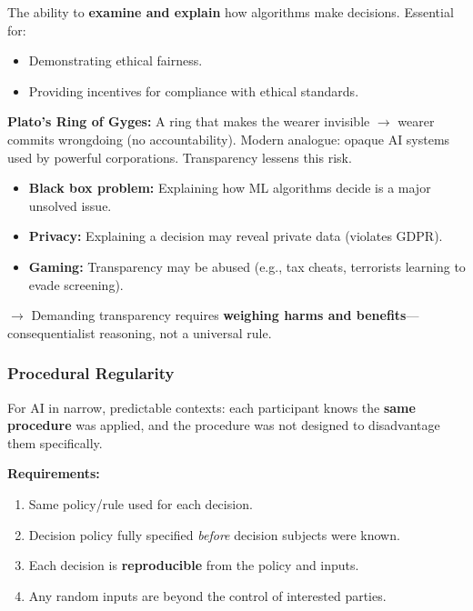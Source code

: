 \begin{defbox}[Transparency]
The ability to \textbf{examine and explain} how algorithms make decisions. Essential for:
\begin{itemize}
  \item Demonstrating ethical fairness.
  \item Providing incentives for compliance with ethical standards.
\end{itemize}

\textbf{Plato's Ring of Gyges:} A ring that makes the wearer invisible $\to$ wearer commits wrongdoing (no accountability). Modern analogue: opaque AI systems used by powerful corporations. Transparency lessens this risk.
\end{defbox}

\begin{tipbox}
\begin{itemize}
  \item \textbf{Black box problem:} Explaining how ML algorithms decide is a major unsolved issue.
  \item \textbf{Privacy:} Explaining a decision may reveal private data (violates GDPR).
  \item \textbf{Gaming:} Transparency may be abused (e.g., tax cheats, terrorists learning to evade screening).
\end{itemize}
$\to$ Demanding transparency requires \textbf{weighing harms and benefits}---consequentialist reasoning, not a universal rule.
\end{tipbox}

\separator

\subsubsection{Procedural Regularity}

\begin{defbox}
For AI in narrow, predictable contexts: each participant knows the \textbf{same procedure} was applied, and the procedure was not designed to disadvantage them specifically.

\textbf{Requirements:}
\begin{enumerate}
  \item Same policy/rule used for each decision.
  \item Decision policy fully specified \textit{before} decision subjects were known.
  \item Each decision is \textbf{reproducible} from the policy and inputs.
  \item Any random inputs are beyond the control of interested parties.
\end{enumerate}
\end{defbox}

